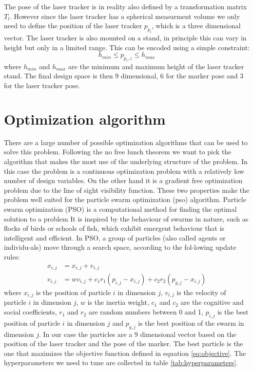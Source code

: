 \documentclass{svproc}
\begin{document}
The pose of the laser tracker is in reality also defined by a transformation matrix $T_{l}$.
However since the laser tracker has a spherical measurment volume we only need to define the position of the laser tracker $p_{p_l}$, which is a three dimensional vector.
The laser tracker is also mounted on a stand, in principle this can vary in height but only in a limited range.
This can be encoded using a simple constraint:
\begin{equation}
    h_{min} \leq p_{p_l,z} \leq h_{max}
\end{equation}
where $h_{min}$ and $h_{max}$ are the minimum and maximum height of the laser tracker stand.
The final design space is then 9 dimensional, 6 for the marker pose and 3 for the laser tracker pose.

\section{Optimization algorithm}
There are a large number of possible optimization algorithms that can be used to solve this problem.
Following the no free lunch theorem we want to pick the algorithm that makes the most use of the underlying structure of the problem. %
In this case the problem is a continuous optimization problem with a relatively low number of design variables.
On the other hand it is a gradient free optimization problem due to the line of sight visibility function.
These two properties make the problem well suited for the particle swarm optimization (pso) algorithm.
Particle swarm optimization (PSO) is a computational method for finding the optimal solution to a problem
 It is inspired by the behaviour of swarms in nature, such as flocks of birds or schools of fish, which exhibit emergent behaviour that is intelligent and efficient.
 In PSO, a group of particles (also called agents or individu-als) move through a search space, according to the fol-lowing update rules:
\begin{equation}
        \begin{split}
        x_{i,j} &= x_{i,j} + v_{i,j} \\
    v_{i,j} &= wv_{i,j} + c_1r_1(p_{i,j}-x_{i,j}) + c_2r_2(p_{g,j}-x_{i,j})
        \end{split}
\end{equation}
where $x_{i,j}$ is the position of particle $i$ in dimension $j$, $v_{i,j}$ is the velocity of particle $i$ in dimension $j$, $w$ is the inertia weight,
 $c_1$ and $c_2$ are the cognitive and social coefficients, $r_1$ and $r_2$ are random numbers between 0 and 1, $p_{i,j}$ is the best position of particle $i$ in dimension $j$ and $p_{g,j}$
is the best position of the swarm in dimension $j$.
In our case the particles are a 9 dimensional vector based on the position of the laser tracker and the pose of the marker.
The best particle is the one that maximizes the objective function defined in equation \ref{eq:objective}.
The hyperparameters we need to tune are collected in table \ref{tab:hyperparameters}.
\end{document}
